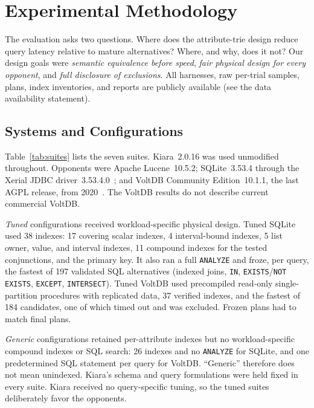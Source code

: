 \section{Experimental Methodology}
\label{sec:methodology}

The evaluation asks two questions. Where does the attribute-trie design reduce query latency relative to mature alternatives? Where, and why, does it not? Our design goals were \emph{semantic equivalence before speed}, \emph{fair physical design for every opponent}, and \emph{full disclosure of exclusions}. All harnesses, raw per-trial samples, plans, index inventories, and reports are publicly available (see the data availability statement).

\subsection{Systems and Configurations}
Table~\ref{tab:suites} lists the seven suites. Kiara~2.0.16 was used unmodified throughout. Opponents were Apache Lucene~10.5.2; SQLite~3.53.4 through the Xerial JDBC driver~3.53.4.0~\cite{gaffney2022sqlite}; and VoltDB Community Edition~10.1.1, the last AGPL release, from 2020~\cite{stonebraker2013voltdb}. The VoltDB results do not describe current commercial VoltDB.

\emph{Tuned} configurations received workload-specific physical design. Tuned SQLite used 38 indexes: 17 covering scalar indexes, 4 interval-bound indexes, 5 list owner, value, and interval indexes, 11 compound indexes for the tested conjunctions, and the primary key. It also ran a full \texttt{ANALYZE} and froze, per query, the fastest of 197 validated SQL alternatives (indexed joins, \texttt{IN}, \texttt{EXISTS}/\texttt{NOT EXISTS}, \texttt{EXCEPT}, \texttt{INTERSECT}). Tuned VoltDB used precompiled read-only single-partition procedures with replicated data, 37 verified indexes, and the fastest of 184 candidates, one of which timed out and was excluded. Frozen plans had to match final plans.

\emph{Generic} configurations retained per-attribute indexes but no workload-specific compound indexes or SQL search: 26 indexes and no \texttt{ANALYZE} for SQLite, and one predetermined SQL statement per query for VoltDB. ``Generic'' therefore does not mean unindexed. Kiara's schema and query formulations were held fixed in every suite. Kiara received no query-specific tuning, so the tuned suites deliberately favor the opponents.

